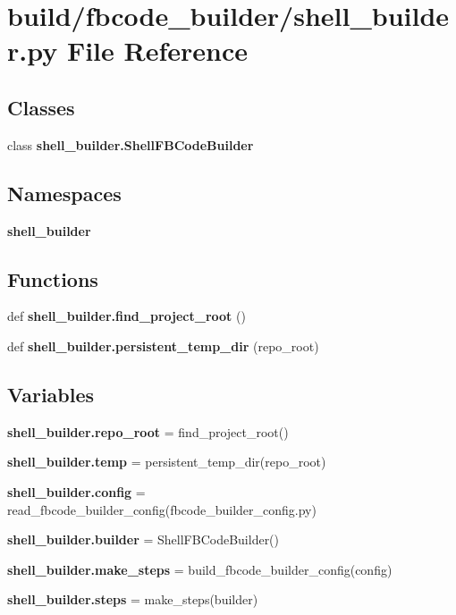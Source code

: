 \section{build/fbcode\+\_\+builder/shell\+\_\+builder.py File Reference}
\label{shell__builder_8py}
\subsection*{Classes}
\begin{DoxyCompactItemize}
\item 
class {\bf shell\+\_\+builder.\+Shell\+F\+B\+Code\+Builder}
\end{DoxyCompactItemize}
\subsection*{Namespaces}
\begin{DoxyCompactItemize}
\item 
 {\bf shell\+\_\+builder}
\end{DoxyCompactItemize}
\subsection*{Functions}
\begin{DoxyCompactItemize}
\item 
def {\bf shell\+\_\+builder.\+find\+\_\+project\+\_\+root} ()
\item 
def {\bf shell\+\_\+builder.\+persistent\+\_\+temp\+\_\+dir} (repo\+\_\+root)
\end{DoxyCompactItemize}
\subsection*{Variables}
\begin{DoxyCompactItemize}
\item 
{\bf shell\+\_\+builder.\+repo\+\_\+root} = find\+\_\+project\+\_\+root()
\item 
{\bf shell\+\_\+builder.\+temp} = persistent\+\_\+temp\+\_\+dir(repo\+\_\+root)
\item 
{\bf shell\+\_\+builder.\+config} = read\+\_\+fbcode\+\_\+builder\+\_\+config(\textquotesingle{}fbcode\+\_\+builder\+\_\+config.\+py\textquotesingle{})
\item 
{\bf shell\+\_\+builder.\+builder} = Shell\+F\+B\+Code\+Builder()
\item 
{\bf shell\+\_\+builder.\+make\+\_\+steps} = build\+\_\+fbcode\+\_\+builder\+\_\+config(config)
\item 
{\bf shell\+\_\+builder.\+steps} = make\+\_\+steps(builder)
\end{DoxyCompactItemize}
